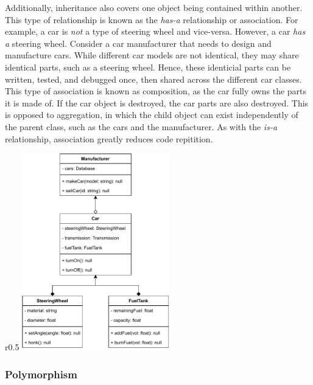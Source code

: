 \documentclass[11pt]{article}
\begin{document}
Additionally, inheritance also covers one object being contained within another. This type of relationship is known as the \textit{has-a} relationship or association. For example, a car is \textit{not} a type of steering wheel and vice-versa. However, a car \textit{has a} steering wheel. Consider a car manufacturer that needs to design and manufacture cars. While different car models are not identical, they may share identical parts, such as a steering wheel. Hence, these identicial parts can be written, tested, and debugged once, then shared across the different car classes. This type of association is known as composition, as the car fully owns the parts it is made of. If the car object is destroyed, the car parts are also destroyed. This is opposed to aggregation, in which the child object can exist independently of the parent class, such as the cars and the manufacturer. As with the \textit{is-a} relationship, association greatly reduces code repitition.

\begin{wrapfig}{r}{0.5\textwidth}
    \vspace{0pt}
    \includegraphics[width=0.48\textwidth]{figures/association.pdf}
    \label{fig:association-uml}
\end{wrapfig}

\subsubsection{Polymorphism}
\end{document}
